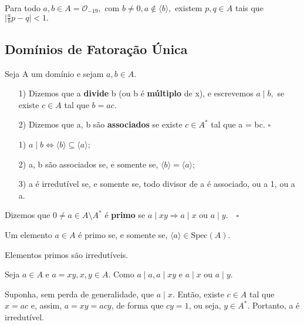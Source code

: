 \documentclass[AlgebraII/algebraII_notes.tex]{subfiles}
\begin{document}
\begin{lemma*}
	Para todo \(a, b\in A = \mathcal{O}_{-19},\) com \(b\neq0, a\not\in \langle b \rangle,\) existem \(p, q\in A\) tais que
	\(\biggl|\frac{a}{b}p - q\biggr| < 1.\)
\end{lemma*}
\subsection{Domínios de Fatoração Única}
\begin{def*}
	Seja A um domínio e sejam \(a, b\in A\).
	\begin{itemize}
		\item[1)] Dizemos que a \textbf{divide} b (ou b é \textbf{múltiplo} de x), e escrevemos \(a\mid b,\) se existe \(c\in A\) tal que \(b = ac.\)
		\item[2)] Dizemos que a, b são \textbf{associados} se existe \(c\in A^{*}\) tal que a = bc. \(\square\)
	\end{itemize}
\end{def*}
\begin{prop*}[Exercício]
	\begin{itemize}
		\item[1)] \(a\mid b \Longleftrightarrow \langle b \rangle \subseteq{\langle a \rangle}\);
		\item[2)] a, b são associados se, e somente se, \(\langle b \rangle = \langle a \rangle\);
		\item[3)] a é irredutível se, e somente se, todo divisor de a é associado, ou a 1, ou a a.
	\end{itemize}
\end{prop*}
\begin{def*}
	Dizemos que \(0\neq a\in A\setminus{A^{*}}\) é \textbf{primo} se \(a\mid xy \Rightarrow a\mid x\) ou \(a\mid y.\quad\square\)
\end{def*}
\begin{prop*}[Exercício]
	Um elemento \(a\in A\) é primo se, e somente se, \(\langle a \rangle\in \mathrm{Spec}(A).\)
\end{prop*}
\begin{lemma*}
	Elementos primos são irredutíveis.
\end{lemma*}
\begin{proof*}
	Seja \(a\in A\) e \(a = xy, x, y\in A.\) Como \(a\mid a, a\mid xy\) e \(a\mid x\) ou \(a\mid y\).

	Suponha, sem perda de generalidade, que \(a\mid x\). Então, existe \(c\in A\) tal que \(x=ac\) e, assim, \(a=xy=acy\), de forma que \(cy = 1\), ou seja,
	\(y\in A^{*}.\) Portanto, a é irredutível. \qedsymbol
\end{proof*}
\end{document}

